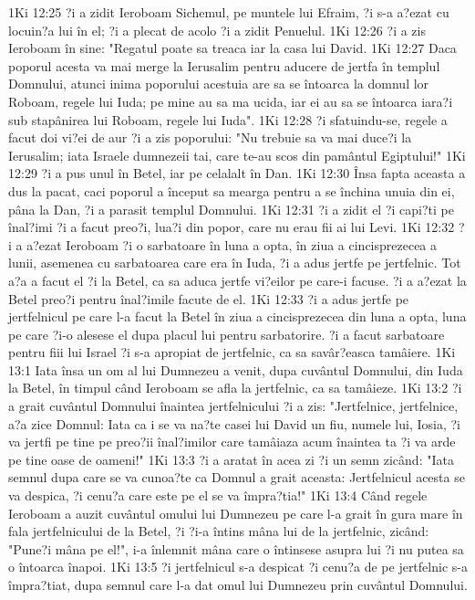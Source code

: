 1Ki 12:25  ?i a zidit Ieroboam Sichemul, pe muntele lui Efraim, ?i s-a a?ezat cu locuin?a lui în el; ?i a plecat de acolo ?i a zidit Penuelul.
1Ki 12:26  ?i a zis Ieroboam în sine: "Regatul poate sa treaca iar la casa lui David.
1Ki 12:27  Daca poporul acesta va mai merge la Ierusalim pentru aducere de jertfa în templul Domnului, atunci inima poporului acestuia are sa se întoarca la domnul lor Roboam, regele lui Iuda; pe mine au sa ma ucida, iar ei au sa se întoarca iara?i sub stapânirea lui Roboam, regele lui Iuda".
1Ki 12:28  ?i sfatuindu-se, regele a facut doi vi?ei de aur ?i a zis poporului: "Nu trebuie sa va mai duce?i la Ierusalim; iata Israele dumnezeii tai, care te-au scos din pamântul Egiptului!"
1Ki 12:29  ?i a pus unul în Betel, iar pe celalalt în Dan.
1Ki 12:30  Însa fapta aceasta a dus la pacat, caci poporul a început sa mearga pentru a se închina unuia din ei, pâna la Dan, ?i a parasit templul Domnului.
1Ki 12:31  ?i a zidit el ?i capi?ti pe înal?imi ?i a facut preo?i, lua?i din popor, care nu erau fii ai lui Levi.
1Ki 12:32  ?i a a?ezat Ieroboam ?i o sarbatoare în luna a opta, în ziua a cincisprezecea a lunii, asemenea cu sarbatoarea care era în Iuda, ?i a adus jertfe pe jertfelnic. Tot a?a a facut el ?i la Betel, ca sa aduca jertfe vi?eilor pe care-i facuse. ?i a a?ezat la Betel preo?i pentru înal?imile facute de el.
1Ki 12:33  ?i a adus jertfe pe jertfelnicul pe care l-a facut la Betel în ziua a cincisprezecea din luna a opta, luna pe care ?i-o alesese el dupa placul lui pentru sarbatorire. ?i a facut sarbatoare pentru fiii lui Israel ?i s-a apropiat de jertfelnic, ca sa savâr?easca tamâiere.
1Ki 13:1  Iata însa un om al lui Dumnezeu a venit, dupa cuvântul Domnului, din Iuda la Betel, în timpul când Ieroboam se afla la jertfelnic, ca sa tamâieze.
1Ki 13:2  ?i a grait cuvântul Domnului înaintea jertfelnicului ?i a zis: "Jertfelnice, jertfelnice, a?a zice Domnul: Iata ca i se va na?te casei lui David un fiu, numele lui, Iosia, ?i va jertfi pe tine pe preo?ii înal?imilor care tamâiaza acum înaintea ta ?i va arde pe tine oase de oameni!"
1Ki 13:3  ?i a aratat în acea zi ?i un semn zicând: "Iata semnul dupa care se va cunoa?te ca Domnul a grait aceasta: Jertfelnicul acesta se va despica, ?i cenu?a care este pe el se va împra?tia!"
1Ki 13:4  Când regele Ieroboam a auzit cuvântul omului lui Dumnezeu pe care l-a grait în gura mare în fala jertfelnicului de la Betel, ?i ?i-a întins mâna lui de la jertfelnic, zicând: "Pune?i mâna pe el!", i-a înlemnit mâna care o întinsese asupra lui ?i nu putea sa o întoarca înapoi.
1Ki 13:5  ?i jertfelnicul s-a despicat ?i cenu?a de pe jertfelnic s-a împra?tiat, dupa semnul care l-a dat omul lui Dumnezeu prin cuvântul Domnului.
